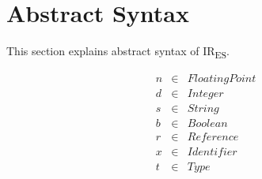 \documentclass[11pt]{article}
\newcommand{\irnameb}[0]{\textbf{IR\textsubscript{ES}}\xspace}
\newcommand{\irname}[0]{IR\textsubscript{ES}\xspace}
\begin{document}



\section{Abstract Syntax}

This section explains abstract syntax of \irname.

\[
\begin{array}{rrl}
n & \in & \textit{FloatingPoint} \\
d & \in & \textit{Integer} \\
s & \in & \textit{String} \\
b & \in & \textit{Boolean} \\
r & \in & \textit{Reference} \\
x & \in & \textit{Identifier} \\
t & \in & \textit{Type} \\
\end{array}
\]
\end{document}
